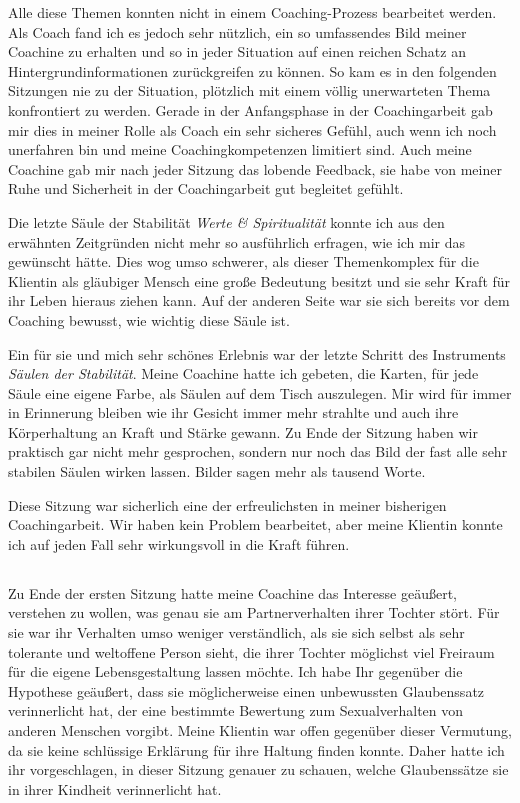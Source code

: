 \documentclass[11pt,a4paper]{article}
\begin{document}
Alle diese Themen konnten nicht in einem Coaching-Prozess bearbeitet werden. Als Coach fand ich es jedoch sehr nützlich, ein so umfassendes Bild meiner Coachine zu erhalten und so in jeder Situation auf einen reichen Schatz an Hintergrundinformationen zurückgreifen zu können. So kam es in den folgenden Sitzungen nie zu der Situation, plötzlich mit einem völlig unerwarteten Thema konfrontiert zu werden. Gerade in der Anfangsphase in der Coachingarbeit gab mir dies in meiner Rolle als Coach ein sehr sicheres Gefühl, auch wenn ich noch unerfahren bin und meine Coachingkompetenzen limitiert sind. Auch meine Coachine gab mir nach jeder Sitzung das lobende Feedback, sie habe von meiner Ruhe und Sicherheit in der Coachingarbeit gut begleitet gefühlt.

Die letzte Säule der Stabilität \textsl{Werte \& Spiritualität} konnte ich aus den erwähnten Zeitgründen nicht mehr so ausführlich erfragen, wie ich mir das gewünscht hätte. Dies wog umso schwerer, als dieser Themenkomplex für die Klientin als gläubiger Mensch eine große Bedeutung besitzt und sie sehr Kraft für ihr Leben hieraus ziehen kann. Auf der anderen Seite war sie sich bereits vor dem Coaching bewusst, wie wichtig diese Säule ist. 

Ein für sie und mich sehr schönes Erlebnis war der letzte Schritt des Instruments \textsl{Säulen der Stabilität}. Meine Coachine hatte ich gebeten, die Karten, für jede Säule eine eigene Farbe, als Säulen auf dem Tisch auszulegen. Mir wird für immer in Erinnerung bleiben wie ihr Gesicht immer mehr strahlte und auch ihre Körperhaltung an Kraft und Stärke gewann. Zu Ende der Sitzung haben wir praktisch gar nicht mehr gesprochen, sondern nur noch das Bild der fast alle sehr stabilen Säulen wirken lassen. Bilder sagen mehr als tausend Worte.

Diese Sitzung war sicherlich eine der erfreulichsten in meiner bisherigen Coachingarbeit. Wir haben kein Problem bearbeitet, aber meine Klientin konnte ich auf jeden Fall sehr wirkungsvoll in die Kraft führen.



\subsection*{\color{Orange}{Zweite Sitzung: Glaubenssätze}}


Zu Ende der ersten Sitzung hatte meine Coachine das Interesse geäußert, verstehen zu wollen, was genau sie am Partnerverhalten ihrer Tochter stört. Für sie war ihr Verhalten umso weniger verständlich, als sie sich selbst als sehr tolerante und weltoffene Person sieht, die ihrer Tochter möglichst viel Freiraum für die eigene Lebensgestaltung lassen möchte. Ich habe Ihr gegenüber die Hypothese geäußert, dass sie möglicherweise einen unbewussten Glaubenssatz verinnerlicht hat, der eine bestimmte Bewertung zum Sexualverhalten von anderen Menschen vorgibt. Meine Klientin war offen gegenüber dieser Vermutung, da sie keine schlüssige Erklärung für ihre Haltung finden konnte. Daher hatte ich ihr vorgeschlagen, in dieser Sitzung genauer zu schauen, welche Glaubenssätze sie in ihrer Kindheit verinnerlicht hat.
\end{document}
